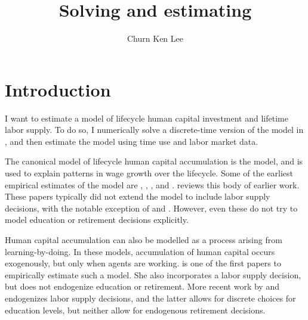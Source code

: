 \documentclass[12pt]{article}
\title{Solving and estimating \textcite{blinder_weiss_1976_lifecycle_human_capital_labor_supply_synthesis}}
\author{Churn Ken Lee}
\date{}
\begin{document}
\maketitle

\section{Introduction}
I want to estimate a model of lifecycle human capital investment and lifetime labor supply. To do so, I numerically solve a discrete-time version of the model in \textcite{blinder_weiss_1976_lifecycle_human_capital_labor_supply_synthesis}, and then estimate the model using time use and labor market data.

The canonical model of lifecycle human capital accumulation is the \textcite{ben-porath_1976_human_capital_lifecycle_earnings} model, and is used to explain patterns in wage growth over the lifecycle. 
Some of the earliest empirical estimates of the model are \textcite{heckman_1976_estimate_human_capital_production_function}, \textcite{heckman_1976_lifecycle_human_capital_labor_supply}, \textcite{haley_1976_lifecycle_human_capital}, and \textcite{rosen_1976_lifecycle_human_capital}.
\textcite{browning_hansen_heckman_1999_micro_data_ge_models} reviews this body of earlier work.
These papers typically did not extend the model to include labor supply decisions, with the notable exception of \textcite{heckman_1976_estimate_human_capital_production_function} and \textcite{heckman_1976_lifecycle_human_capital_labor_supply}.
However, even these do not try to model education or retirement decisions explicitly.

Human capital accumulation can also be modelled as a process arising from learning-by-doing. 
In these models, accumulation of human capital occurs exogenously, but only when agents are working.
\textcite{shaw_1989_lifecycle_labor_supply_human_capital} is one of the first papers to empirically estimate such a model.
She also incorporates a labor supply decision, but does not endogenize education or retirement.
More recent work by \textcite{imai_keane_2004_lifecycle_labor_supply_human_capital_accumulation} and \textcite{blundell_costa-dias_meghir_shaw_2016_female_lifecycle_labor_supply_education_human_capital_welfare} endogenizes labor supply decisions, and the latter allows for discrete choices for education levels, but neither allow for endogenous retirement decisions.
\end{document}
